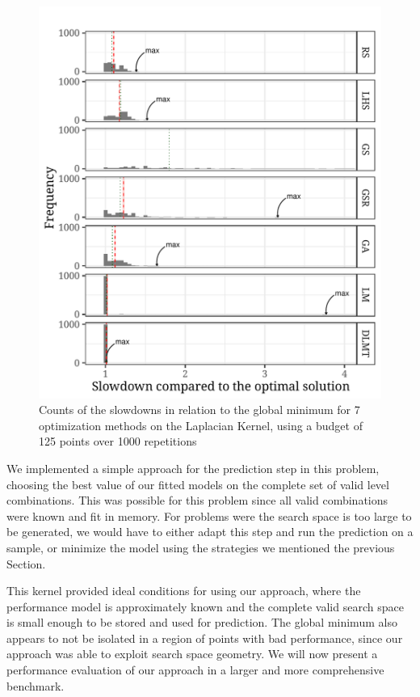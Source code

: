 \documentclass[conference]{IEEEtran}
\begin{document}
\begin{center}
\begin{figure}[ht]
\centering
\includegraphics[width=.9\columnwidth]{./img/comparison_histogram.pdf}
\caption{\label{fig:orgadee906}
Counts of the slowdowns in relation to the global minimum for 7 optimization methods on the Laplacian Kernel, using a budget of 125 points over 1000 repetitions}
\end{figure}
\end{center}

We implemented a simple approach for the prediction step in this problem,
choosing the best value of our fitted models on the complete set of valid level
combinations. This was possible for this problem since all valid combinations
were known and fit in memory. For problems were the search space is too large to
be generated, we would have to either adapt this step and run the prediction on
a sample, or minimize the model using the strategies we mentioned the previous
Section.

This kernel provided ideal conditions for using our approach, where the
performance model is approximately known and the complete valid search space is
small enough to be stored and used for prediction. The global minimum also
appears to not be isolated in a region of points with bad performance, since our
approach was able to exploit search space geometry. We will now present a
performance evaluation of our approach in a larger and more comprehensive
benchmark.
\end{document}
